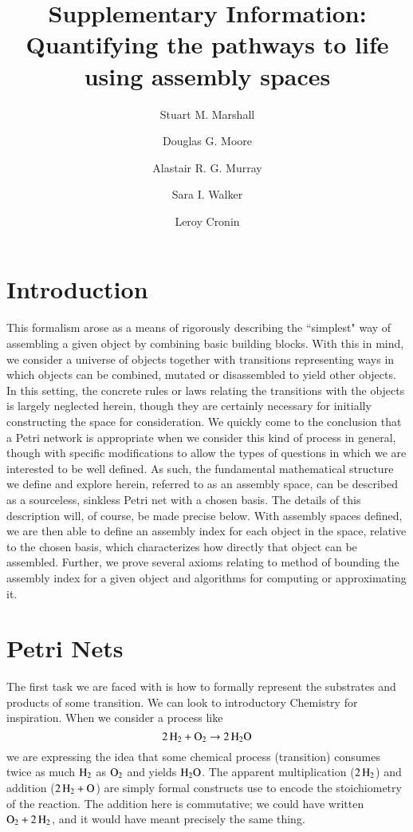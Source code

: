 \documentclass[aps,prd,onecolumn,nofootinbib,letterpaper,preprintnumbers,superscriptaddress,eqsecnum]{revtex4}
\theoremstyle{definition}
\begin{document}
\title{Supplementary Information: Quantifying the pathways to life using assembly spaces}
\author{Stuart M. Marshall}
\author{Douglas G. Moore}
\author{Alastair R. G. Murray}
\author{Sara I. Walker}
\author{Leroy Cronin}

\maketitle

\section{Introduction}

This formalism arose as a means of rigorously describing the ``simplest" way of assembling a given object by combining basic building blocks.
With this in mind, we consider a universe of objects together with transitions representing ways in which objects can be combined, mutated or disassembled to yield other objects.
In this setting, the concrete rules or laws relating the transitions with the objects is largely neglected herein, though they are certainly necessary for initially constructing the space for consideration.
We quickly come to the conclusion that a Petri network is appropriate when we consider this kind of process in general, though with specific modifications to allow the types of questions in which we are interested to be well defined.
As such, the fundamental mathematical structure we define and explore herein, referred to as an assembly space, can be described as a sourceless, sinkless Petri net with a chosen basis.
The details of this description will, of course, be made precise below.
With assembly spaces defined, we are then able to define an assembly index for each object in the space, relative to the chosen basis, which characterizes how directly that object can be assembled.
Further, we prove several axioms relating to method of bounding the assembly index for a given object and algorithms for computing or approximating it.

\section{Petri Nets}

The first task we are faced with is how to formally represent the substrates and products of some transition.
We can look to introductory Chemistry for inspiration.
When we consider a process like
\begin{equation*}
    \ce{2H_2} + \ce{O_2} \rightarrow \ce{2H_2O}
\end{equation*}
we are expressing the idea that some chemical process (transition) consumes twice as much $\ce{H_2}$ as $\ce{O_2}$ and yields $\ce{H_2O}$.
The apparent multiplication ($\ce{2H_2}$) and addition ($\ce{2H_2} + \ce{O_}$) are simply formal constructs use to encode the stoichiometry of the reaction.
The addition here is commutative; we could have written $\ce{O_2} + \ce{2H_2}$, and it would have meant precisely the same thing.
\end{document}
